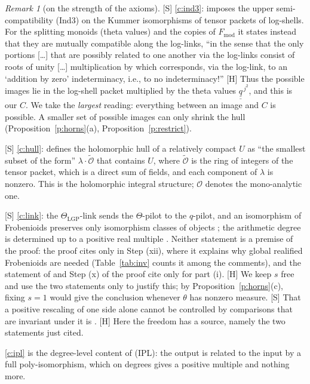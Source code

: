 \documentclass[11pt]{article}
\theoremstyle{plain}
\theoremstyle{definition}
\theoremstyle{remark}
\newtheorem{remark}[theorem]{Remark}
\newcommand{\Smark}{\textup{[S]}}
\newcommand{\Hmark}{\textup{[H]}}
\newcommand{\cO}{\mathcal O}
\newcommand{\qbb}{\underline{\underline q}}
\newcommand{\tO}{\widetilde{\mathcal O}}
\begin{document}
\begin{remark}[on the strength of the axioms]\label{r:strength}
\Smark{} \ref{c:ind3}: \cite[Thm.~3.11(ii)]{IUT3} imposes the upper
semi-compatibility (Ind3) on the Kummer isomorphisms of tensor packets of log-shells.
For the splitting monoids (theta values) and the copies of $F_{\mathrm{mod}}$ it states
instead that they are mutually compatible along the log-links, ``in the sense that the
only portions [\dots] that are possibly related to one another via the log-links consist
of roots of unity [\dots] multiplication by which corresponds, via the log-link, to an
`addition by zero' indeterminacy, i.e., to no indeterminacy!'' \Hmark{} Thus the possible images
lie in the log-shell packet multiplied by the theta values $\qbb^{\,j^2}$, and this is our
$C$. We take the \emph{largest} reading: everything between an image and $C$ is possible.
A smaller set of possible images can only shrink the hull
(Proposition~\ref{p:horns}(a), Proposition~\ref{p:restrict}).

\Smark{} \ref{c:hull}: \cite[Rem.~3.9.5(i)]{IUT3} defines the holomorphic hull of a
relatively compact $U$ as ``the smallest subset of the form'' $\lambda\cdot\tO$ that
contains $U$, where $\tO$ is the ring of integers of the tensor packet, which is a direct
sum of fields, and each component of $\lambda$ is nonzero. This is the holomorphic
integral structure; $\cO$ denotes the mono-analytic one.

\Smark{} \ref{c:link}: the $\Theta_{\mathrm{LGP}}$-link sends the $\Theta$-pilot to the
$q$-pilot, and an isomorphism of Frobenioids preserves only isomorphism classes of
objects \cite[Rem.~3.6.2(i)]{IUT3}; the arithmetic degree is determined up to a positive
real multiple \cite[Cor.~4.10(v)]{IUT2}. Neither statement is a premise of the proof: the
proof cites \cite[Rem.~3.6.2(i)]{IUT3} only in Step (xii), where it explains why global
realified Frobenioids are needed (Table~\ref{tab:inv} counts it among the comments), and
the statement of \cite[Cor.~3.12]{IUT3} and Step (x) of the proof cite
\cite[Cor.~4.10]{IUT2} only for part (i). \Hmark{} We keep $s$ free and use the
two statements only to justify this; by Proposition~\ref{p:horns}(c), fixing $s=1$ would
give the conclusion whenever $\theta$ has nonzero measure. \Smark{} That a positive
rescaling of one side alone cannot be controlled by comparisons that are invariant under it
is \cite[Cor.~9.2]{Pajo}. \Hmark{} Here the freedom has a source, namely the two
statements just cited.

\ref{c:ipl} is the degree-level content of (IPL): the output is related to the input by a
full poly-isomorphism, which on degrees gives a positive multiple and nothing more.
\end{remark}
\end{document}
